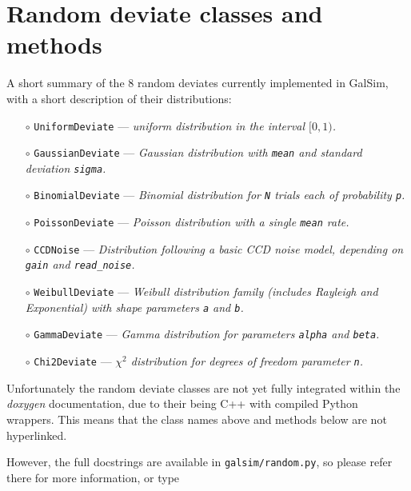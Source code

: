 \documentclass[preprint,11pt]{aastex}
\begin{document}
\section{Random deviate classes and methods}\label{sect:random}
A short summary of the 8 random deviates currently implemented in GalSim,
with a short description of their distributions:
\begin{itemize}

\item[$\circ$] \texttt{UniformDeviate} --- \emph{uniform distribution in the
  interval $[0, 1)$.}

\item[$\circ$] \texttt{GaussianDeviate} --- \emph{Gaussian distribution
with \texttt{mean} and standard deviation \texttt{sigma}.}

\item[$\circ$] \texttt{BinomialDeviate} --- \emph{Binomial
    distribution for \texttt{N} trials each of probability \texttt{p}.}

\item[$\circ$] \texttt{PoissonDeviate} --- \emph{Poisson distribution
    with a single \texttt{mean} rate.}

\item[$\circ$] \texttt{CCDNoise}  --- \emph{Distribution following a
    basic CCD noise model, depending on \texttt{gain} and \texttt{read\_noise}.}

\item[$\circ$] \texttt{WeibullDeviate} --- \emph{Weibull distribution
    family (includes Rayleigh and Exponential) with shape parameters \texttt{a} and \texttt{b}.}

\item[$\circ$] \texttt{GammaDeviate} --- \emph{Gamma distribution for
    parameters \texttt{alpha} and \texttt{beta}.}

\item[$\circ$] \texttt{Chi2Deviate} --- \emph{$\chi^2$ distribution
    for degrees of freedom parameter \texttt{n}.}

\end{itemize}

Unfortunately the random deviate classes are not yet fully integrated within
the \emph{doxygen} documentation, due to their being C++ with compiled
Python wrappers.  This means that the class names above and methods
below are not
hyperlinked.

However, the full docstrings are available in
\texttt{galsim/random.py}, so please refer there for more information,
or type
\end{document}
